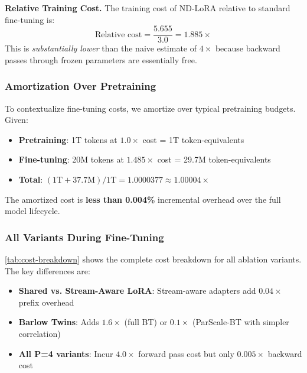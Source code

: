 \documentclass{article} %
\begin{document}
\noindent\textbf{Relative Training Cost.}
The training cost of ND-LoRA relative to standard fine-tuning is:
\begin{equation}
  \text{Relative cost} = \frac{5.655}{3.0} = 1.885\times
\end{equation}
This is \emph{substantially lower} than the naive estimate of $4\times$ because backward passes through
frozen parameters are essentially free.

\subsubsection{Amortization Over Pretraining}

To contextualize fine-tuning costs, we amortize over typical pretraining budgets. Given:
\begin{itemize}
  \item \textbf{Pretraining}: 1T tokens at $1.0\times$ cost = 1T token-equivalents
  \item \textbf{Fine-tuning}: 20M tokens at $1.485\times$ cost = 29.7M token-equivalents
  \item \textbf{Total}: $(1\text{T} + 37.7\text{M}) / 1\text{T} = 1.0000377 \approx 1.00004\times$
\end{itemize}
The amortized cost is \textbf{less than 0.004\%} incremental overhead over the full model lifecycle.

\subsubsection{All Variants During Fine-Tuning}

\autoref{tab:cost-breakdown} shows the complete cost breakdown for all ablation variants. The key differences are:
\begin{itemize}
  \item \textbf{Shared vs. Stream-Aware LoRA}: Stream-aware adapters add $0.04\times$ prefix overhead
  \item \textbf{Barlow Twins}: Adds $1.6\times$ (full BT) or $0.1\times$ (ParScale-BT with simpler correlation)
  \item \textbf{All P=4 variants}: Incur $4.0\times$ forward pass cost but only $0.005\times$ backward cost
\end{itemize}
\end{document}
